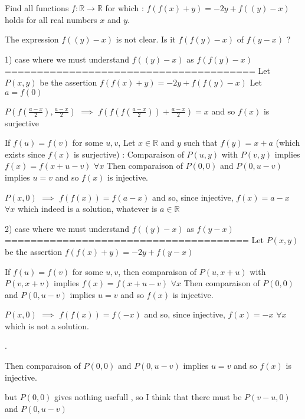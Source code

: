 \begin{solution}
	\begin{tcolorbox}Find all functions $f: \mathbb{R}\rightarrow \mathbb{R}$ for which :
$f(f(x)+y)=-2y+f((y)-x)$
holds for all real numbers $x$ and $y$.\end{tcolorbox}
The expression $f((y)-x)$ is not clear. Is it $f(f(y)-x)$ of $f(y-x)$ ?

1) case where we must understand $f((y)-x)$ as $f(f(y)-x)$
=======================================
Let $P(x,y)$ be the assertion $f(f(x)+y)=-2y+f(f(y)-x)$
Let $a=f(0)$

$P(f(\frac{a-x}2),\frac{a-x}2)$ $\implies$ $f(f(f(\frac{a-x}2))+\frac{a-x}2)=x$ and so $f(x)$ is surjective

If $f(u)=f(v)$ for some $u,v$, Let $x\in\mathbb R$ and $y$ such that $f(y)=x+a$ (which exists since $f(x)$ is surjective) :
Comparaison of $P(u,y)$ with $P(v,y)$ implies $f(x)=f(x+u-v)$ $\forall x$
Then comparaison of $P(0,0)$ and $P(0,u-v)$ implies $u=v$ and so $f(x)$ is injective.

$P(x,0)$ $\implies$ $f(f(x))=f(a-x)$ and so, since injective, $\boxed{f(x)=a-x}$ $\forall x$ which indeed is a solution, whatever is $a\in\mathbb R$

2) case where we must understand $f((y)-x)$ as $f(y-x)$
======================================
Let $P(x,y)$ be the assertion $f(f(x)+y)=-2y+f(y-x)$

If $f(u)=f(v)$ for some $u,v$, then comparaison of $P(u,x+u)$ with $P(v,x+v)$ implies $f(x)=f(x+u-v)$ $\forall x$
Then comparaison of $P(0,0)$ and $P(0,u-v)$ implies $u=v$ and so $f(x)$ is injective.

$P(x,0)$ $\implies$ $f(f(x))=f(-x)$ and so, since injective, $f(x)=-x$ $\forall x$ which is not a solution.

.
\end{solution}



\begin{solution}
	Then comparaison of $P(0,0)$ and $P(0,u-v)$ implies $u=v$ and so $f(x)$ is injective.

but $P(0,0)$ gives nothing usefull , so I think that there must be $P(v-u,0)$ and $P(0,u-v)$
\end{solution}



